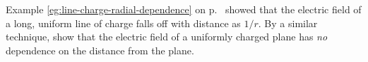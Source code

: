Example \ref{eg:line-charge-radial-dependence} on p.~\pageref{eg:line-charge-radial-dependence} showed
that the electric field of a long, uniform line of charge falls off with distance as $1/r$. By a similar
technique, show that the electric field of a uniformly charged plane has \emph{no} dependence on the
distance from the plane.
